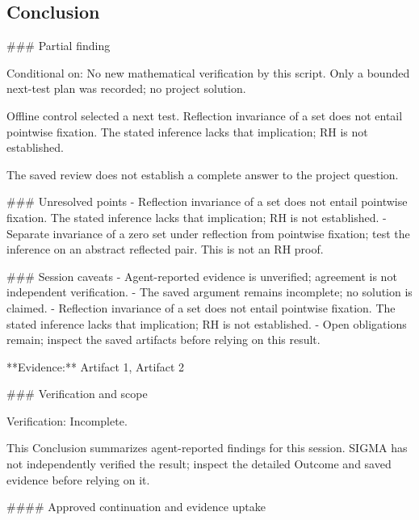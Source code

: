 \documentclass[11pt]{article}
\begin{document}
\subsection{Conclusion}
\#\#\# Partial finding

Conditional on: No new mathematical verification by this script. Only a bounded next-test plan was recorded; no project solution.

Offline control selected a next test. Reflection invariance of a set does not entail pointwise fixation. The stated inference lacks that implication; RH is not established.

The saved review does not establish a complete answer to the project question.

\#\#\# Unresolved points
- Reflection invariance of a set does not entail pointwise fixation. The stated inference lacks that implication; RH is not established.
- Separate invariance of a zero set under reflection from pointwise fixation; test the inference on an abstract reflected pair. This is not an RH proof.

\#\#\# Session caveats
- Agent-reported evidence is unverified; agreement is not independent verification.
- The saved argument remains incomplete; no solution is claimed.
- Reflection invariance of a set does not entail pointwise fixation. The stated inference lacks that implication; RH is not established.
- Open obligations remain; inspect the saved artifacts before relying on this result.

**Evidence:** Artifact 1, Artifact 2

\#\#\# Verification and scope

Verification: Incomplete.

This Conclusion summarizes agent-reported findings for this session. SIGMA has not independently verified the result; inspect the detailed Outcome and saved evidence before relying on it.

\#\#\#\# Approved continuation and evidence uptake
\end{document}
